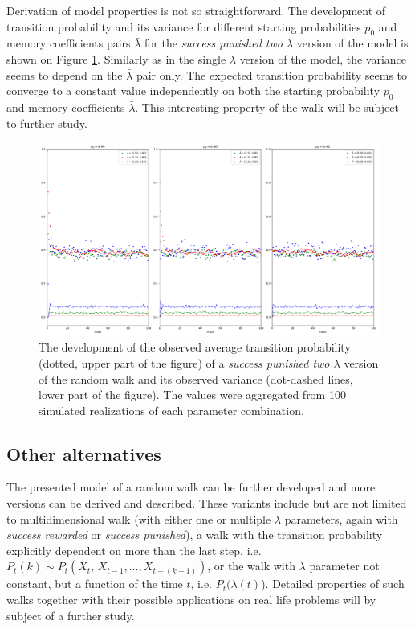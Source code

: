 \documentclass{amsart}
\theoremstyle{definition}
\theoremstyle{plain}
\theoremstyle{plain}
\numberwithin{equation}{section}
\begin{document}
Derivation of model properties is not so straightforward. The development
of transition probability and its variance for different starting
probabilities $p_{0}$ and memory coefficients pairs $\bar{\lambda}$
for the \emph{success punished two $\lambda$ }version of the model
is shown on Figure \ref{fig:Development-punish2l}. Similarly as in
the single $\lambda$ version of the model, the variance seems to
depend on the $\bar{\lambda}$ pair only. The expected transition
probability seems to converge to a constant value independently on
both the starting probability $p_{0}$ and memory coefficients $\bar{\lambda}$.
This interesting property of the walk will be subject to further study.

\begin{figure}
 \begin{center}
\includegraphics[width=1\textwidth]{../simulations/ept_100_walks_100_steps_type_success_punished_two_lambdas}
\caption{\label{fig:Development-punish2l}The development of the observed average
transition probability (dotted, upper part of the figure) of a \emph{success
punished two $\lambda$ }version of the random walk and its observed
variance (dot-dashed lines, lower part of the figure). The values
were aggregated from 100 simulated realizations of each parameter
combination.}
 \end{center}
\end{figure}


\subsection{Other alternatives}

The presented model of a random walk can be further developed and
more versions can be derived and described. These variants include
but are not limited to multidimensional walk (with either one or multiple
$\lambda$ parameters, again with \emph{success rewarded }or \emph{success
punished}), a walk with the transition probability explicitly dependent
on more than the last step, i.e. $P_{t}(k)\sim P_{t}(X_{t},\,X_{t-1},\dots,X_{t-(k-1)})$,
or the walk with $\lambda$ parameter not constant, but a function
of the time $t$, i.e. $P_{t}(\lambda(t)$). Detailed properties of
such walks together with their possible applications on real life
problems will by subject of a further study.
\end{document}
